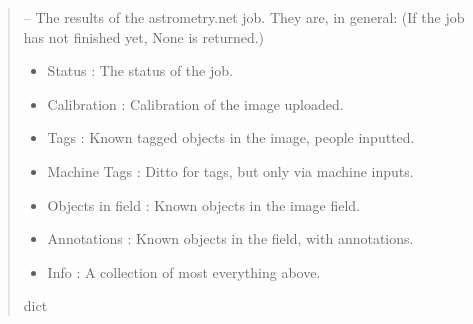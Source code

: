 \documentclass[letterpaper,11pt,english]{sphinxmanual}
\begin{document}
\begin{savenotes}
\begin{fulllineitems}
\begin{savenotes}
\begin{fulllineitems}
\begin{quote}
\begin{description}
\sphinxAtStartPar

\sphinxAtStartPar
{} – The results of the astrometry.net job. They are, in general: (If
the job has not finished yet, None is returned.)
\begin{itemize}
\item {} 
\sphinxAtStartPar
Status : The status of the job.

\item {} 
\sphinxAtStartPar
Calibration : Calibration of the image uploaded.

\item {} 
\sphinxAtStartPar
Tags : Known tagged objects in the image, people inputted.

\item {} 
\sphinxAtStartPar
Machine Tags : Ditto for tags, but only via machine inputs.

\item {} 
\sphinxAtStartPar
Objects in field : Known objects in the image field.

\item {} 
\sphinxAtStartPar
Annotations : Known objects in the field, with annotations.

\item {} 
\sphinxAtStartPar
Info : A collection of most everything above.

\end{itemize}


\sphinxAtStartPar
dict

\end{description}\end{quote}

\end{fulllineitems}\end{savenotes}



\end{fulllineitems}
\end{savenotes}
\end{document}
